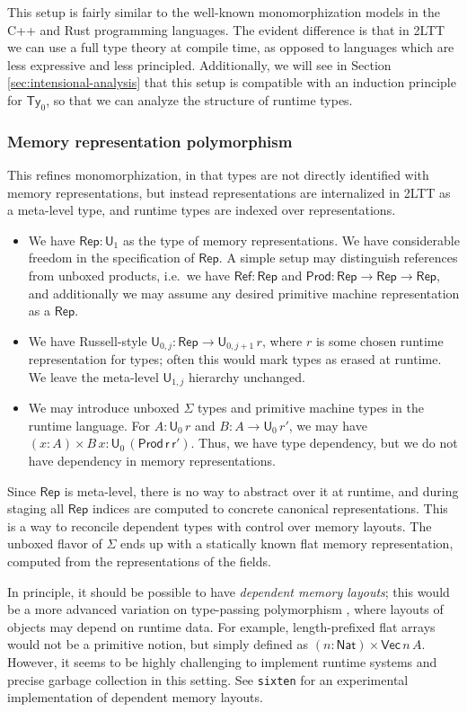 \documentclass[acmsmall]{acmart}
\newcommand{\msf}[1]{\mathsf{#1}}
\renewcommand{\U}{\msf{U}}
\newcommand{\Ty}{\msf{Ty}}
\newcommand{\Nat}{\msf{Nat}}
\newcommand{\Rep}{\msf{Rep}}
\theoremstyle{remark}
\begin{document}
This setup is fairly similar to the well-known monomorphization models in the
C++ and Rust programming languages. The evident difference is that in 2LTT we
can use a full type theory at compile time, as opposed to languages which are
less expressive and less principled. Additionally, we will see in Section
\ref{sec:intensional-analysis} that this setup is compatible with an induction principle for
$\Ty_0$, so that we can analyze the structure of runtime types.

\subsubsection{Memory representation polymorphism}

This refines monomorphization, in that types are not directly identified with
memory representations, but instead representations are internalized in 2LTT as
a meta-level type, and runtime types are indexed over representations.
\begin{itemize}
\item We have $\Rep : \U_1$ as the type of memory representations. We have
  considerable freedom in the specification of $\Rep$. A simple setup may
  distinguish references from unboxed products, i.e.\ we have $\msf{Ref} : \Rep$
  and $\msf{Prod} : \Rep \to \Rep \to \Rep$, and additionally we may assume
  any desired primitive machine representation as a $\Rep$.
\item We have Russell-style $\U_{0,j} : \Rep \to \U_{0, j+1}\,r$, where $r$ is
  some chosen runtime representation for types; often this would mark types as
  erased at runtime. We leave the meta-level $\U_{1,j}$ hierarchy unchanged.
\item We may introduce unboxed $\Sigma$ types and primitive machine types in the
  runtime language. For $A : \U_{0}\,r$ and $B : A \to \U_{0}\,r'$, we may have
  $(x : A) \times B\,x : \U_{0}\,(\msf{Prod\,r\,r'})$. Thus, we have
  type dependency, but we do not have dependency in memory representations.
\end{itemize}
Since $\Rep$ is meta-level, there is no way to abstract over it at runtime, and
during staging all $\Rep$ indices are computed to concrete canonical
representations. This is a way to reconcile dependent types with control over
memory layouts.  The unboxed flavor of $\Sigma$ ends up with a statically known
flat memory representation, computed from the representations of the fields.

In principle, it should be possible to have \emph{dependent memory layouts};
this would be a more advanced variation on type-passing polymorphism
\cite{intensional-poly}, where layouts of objects may depend on runtime data. For example,
length-prefixed flat arrays would not be a primitive notion, but simply defined
as $(n : \Nat) \times \msf{Vec}\,n\,A$. However, it seems to be highly
challenging to implement runtime systems and precise garbage collection in this
setting. See \texttt{sixten} \cite{sixten} for an experimental implementation of
dependent memory layouts.
\end{document}
